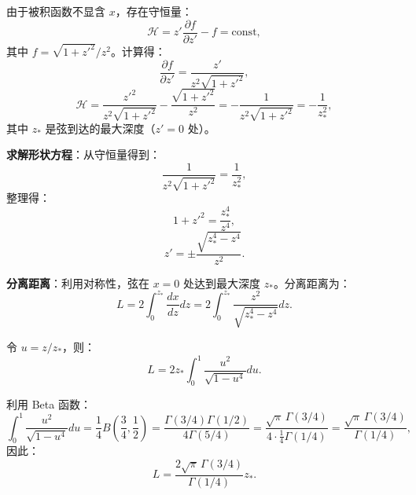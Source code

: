 \begin{theorem}[欧拉-拉格朗日方程与守恒量]
由于被积函数不显含 $x$，存在守恒量：
\begin{equation}
    \mathcal{H} = z' \frac{\partial f}{\partial z'} - f = \text{const},
\end{equation}
其中 $f = \sqrt{1 + z'^2}/z^2$。计算得：
\begin{equation}
    \frac{\partial f}{\partial z'} = \frac{z'}{z^2 \sqrt{1 + z'^2}},
\end{equation}
\begin{equation}
    \mathcal{H} = \frac{z'^2}{z^2 \sqrt{1 + z'^2}} - \frac{\sqrt{1 + z'^2}}{z^2} = -\frac{1}{z^2 \sqrt{1 + z'^2}} = -\frac{1}{z_*^2},
\end{equation}
其中 $z_*$ 是弦到达的最大深度（$z'=0$ 处）。
\end{theorem}

\textbf{求解形状方程}：从守恒量得到：
\begin{equation}
    \frac{1}{z^2 \sqrt{1 + z'^2}} = \frac{1}{z_*^2},
\end{equation}
整理得：
\begin{equation}
    1 + z'^2 = \frac{z_*^4}{z^4},
\end{equation}
\begin{equation}
    z' = \pm \frac{\sqrt{z_*^4 - z^4}}{z^2}.
\end{equation}

\textbf{分离距离}：利用对称性，弦在 $x=0$ 处达到最大深度 $z_*$。分离距离为：
\begin{equation}
    L = 2 \int_0^{z_*} \frac{dx}{dz} dz = 2 \int_0^{z_*} \frac{z^2}{\sqrt{z_*^4 - z^4}} dz.
\end{equation}

令 $u = z/z_*$，则：
\begin{equation}
    L = 2 z_* \int_0^1 \frac{u^2}{\sqrt{1 - u^4}} du.
\end{equation}

利用 Beta 函数：
\begin{equation}
    \int_0^1 \frac{u^2}{\sqrt{1 - u^4}} du = \frac{1}{4} B\left(\frac{3}{4}, \frac{1}{2}\right) = \frac{\Gamma(3/4) \Gamma(1/2)}{4 \Gamma(5/4)} = \frac{\sqrt{\pi} \, \Gamma(3/4)}{4 \cdot \frac{1}{4} \Gamma(1/4)} = \frac{\sqrt{\pi} \, \Gamma(3/4)}{\Gamma(1/4)},
\end{equation}
因此：
\begin{equation}
    L = \frac{2 \sqrt{\pi} \, \Gamma(3/4)}{\Gamma(1/4)} z_*.
\end{equation}

